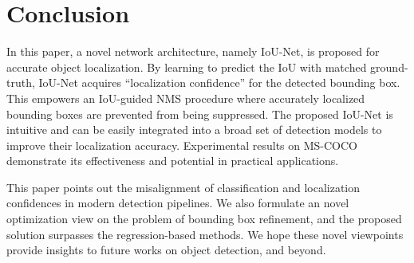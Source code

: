 \documentclass[runningheads]{llncs}
\begin{document}
\begin{table}[!t]
\centering
{}
\caption{Inference speed of multiple object detectors on a single TITAN X GPU. The models share the same backbone network ResNet50-FPN. The input resolution is 1200x800. All hyper-parameters are set to be the same.}
\label{tab:exp:speed}
\end{table}
 
\section{Conclusion}
In this paper, a novel network architecture, namely IoU-Net, is proposed for accurate object localization. By learning to predict the IoU with matched ground-truth, IoU-Net acquires ``localization confidence'' for the detected bounding box. This empowers an IoU-guided NMS procedure where accurately localized bounding boxes are prevented from being suppressed.
The proposed IoU-Net is intuitive and can be easily integrated into a broad set of detection models to improve their localization accuracy. Experimental results on MS-COCO demonstrate its effectiveness and potential in practical applications.

This paper points out the misalignment of classification and localization confidences in modern detection pipelines.
We also formulate an novel optimization view on the problem of bounding box refinement, and the proposed solution surpasses the regression-based methods.
We hope these novel viewpoints provide insights to future works on object detection, and beyond.



\end{document}
